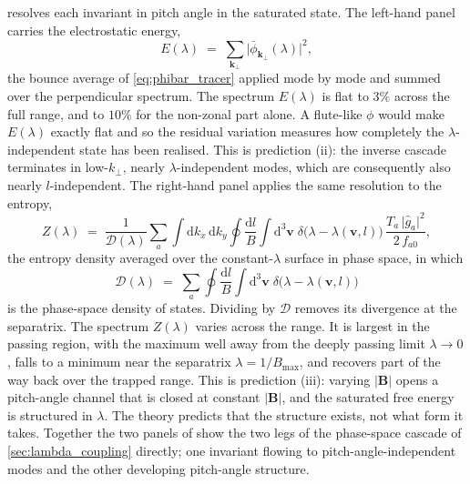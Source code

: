 \documentclass{jpp}
\newcommand{\rmd}{\text{d}}
\newcommand{\bv}{\mathbf{v}}
\newcommand{\bB}{\mathbf{B}}
\newcommand{\kperp}{k_\perp}
\begin{document}
 resolves each invariant in pitch angle in the saturated state. The left-hand panel carries the electrostatic energy,
\begin{equation}\label{eq:E_lambda}
E(\lambda) \;=\; \sum_{\mathbf{k}_\perp} \bigl|\bar\phi_{\mathbf{k}_\perp}(\lambda)\bigr|^2,
\end{equation}
the bounce average of \cref{eq:phibar_tracer} applied mode by mode and summed over the perpendicular spectrum. The spectrum $E(\lambda)$ is flat to $3\%$ across the full range, and to $10\%$ for the non-zonal part alone. A flute-like $\phi$ would make $E(\lambda)$ exactly flat and so the residual variation measures how completely the $\lambda$-independent state has been realised. This is prediction (ii): the inverse cascade terminates in low-$\kperp$, nearly $\lambda$-independent modes, which are consequently also nearly $l$-independent. The right-hand panel applies the same resolution to the entropy,
\begin{equation}\label{eq:Z_lambda}
Z(\lambda) \;=\; \frac{1}{\mathcal{D}(\lambda)}\sum_a \int \rmd k_x\, \rmd k_y \oint \frac{\rmd l}{B}\int \rmd^3\bv\; \delta\!\bigl(\lambda - \lambda(\bv, l)\bigr)\, \frac{T_a\,\bigl|\hat g_a\bigr|^2}{2\, f_{a0}},
\end{equation}
the entropy density averaged over the constant-$\lambda$ surface in phase space, in which
\begin{equation}\label{eq:dos}
\mathcal{D}(\lambda) \;=\; \sum_a \oint \frac{\rmd l}{B}\int \rmd^3\bv\; \delta\!\bigl(\lambda - \lambda(\bv, l)\bigr)
\end{equation}
is the phase-space density of states. Dividing by $\mathcal{D}$ removes its divergence at the separatrix. The spectrum $Z(\lambda)$ varies across the range. It is largest in the passing region, with the maximum well away from the deeply passing limit $\lambda \to 0$, falls to a minimum near the separatrix $\lambda = 1/B_\mathrm{max}$, and recovers part of the way back over the trapped range. This is prediction (iii): varying $|\bB|$ opens a pitch-angle channel that is closed at constant $|\bB|$, and the saturated free energy is structured in $\lambda$. The theory predicts that the structure exists, not what form it takes. Together the two panels of  show the two legs of the phase-space cascade of \cref{sec:lambda_coupling} directly; one invariant flowing to pitch-angle-independent modes and the other developing pitch-angle structure.
\end{document}
